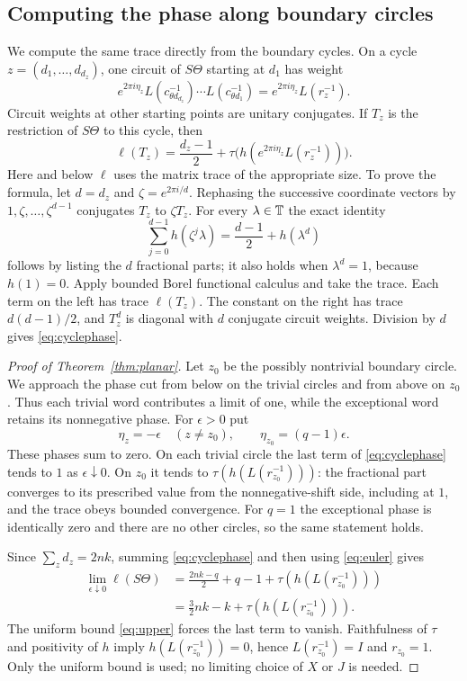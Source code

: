 \subsection{Computing the phase along boundary circles}

We compute the same trace directly from the boundary cycles. On a cycle
$z=(d_1,\ldots,d_{d_z})$, one circuit of $S\Theta$ starting at $d_1$ has
weight
\[
 e^{2\pi i\eta_z}
 L(c_{\theta d_{d_z}}^{-1})\cdots L(c_{\theta d_1}^{-1})
 =e^{2\pi i\eta_z}L(r_z^{-1}).
\]
Circuit weights at other starting points are unitary conjugates.
If $T_z$ is the restriction of $S\Theta$ to this cycle, then
\begin{equation}\label{eq:cyclephase}
 \ell(T_z)=\frac{d_z-1}{2}
   +\tau\bigl(h(e^{2\pi i\eta_z}L(r_z^{-1}))\bigr).
\end{equation}
Here and below $\ell$ uses the matrix trace of the appropriate size.
To prove the formula, let $d=d_z$ and $\zeta=e^{2\pi i/d}$.
Rephasing the successive coordinate vectors by $1,\zeta,\ldots,\zeta^{d-1}$
conjugates $T_z$ to $\zeta T_z$. For every $\lambda\in\mathbb T$ the exact identity
\[
 \sum_{j=0}^{d-1}h(\zeta^j\lambda)
   =\frac{d-1}{2}+h(\lambda^d)
\]
follows by listing the $d$ fractional parts; it also holds when
$\lambda^d=1$, because $h(1)=0$. Apply bounded Borel functional calculus
and take the trace. Each term on the left has trace $\ell(T_z)$.
The constant on the right has trace $d(d-1)/2$, and $T_z^d$ is diagonal
with $d$ conjugate circuit weights. Division by $d$ gives
\eqref{eq:cyclephase}.

\begin{proof}[Proof of Theorem~\ref{thm:planar}]
Let $z_0$ be the possibly nontrivial boundary circle.
We approach the phase cut from below on the trivial circles and from
above on $z_0$. Thus each trivial word contributes a limit of one, while
the exceptional word retains its nonnegative phase. For $\epsilon>0$ put
\[
 \eta_z=-\epsilon\quad(z\ne z_0),\qquad
 \eta_{z_0}=(q-1)\epsilon.
\]
These phases sum to zero. On each trivial circle the last term of
\eqref{eq:cyclephase} tends to $1$ as $\epsilon\downarrow0$.
On $z_0$ it tends to $\tau(h(L(r_{z_0}^{-1})))$: the fractional part
converges to its prescribed value from the nonnegative-shift side,
including at $1$, and the trace obeys bounded convergence.
For $q=1$ the exceptional phase is identically zero and there are no other
circles, so the same statement holds.

Since $\sum_zd_z=2nk$, summing \eqref{eq:cyclephase} and then using
\eqref{eq:euler} gives
\begin{align*}
 \lim_{\epsilon\downarrow0}\ell(S\Theta)
 &=\frac{2nk-q}{2}+q-1+\tau(h(L(r_{z_0}^{-1})))\\
 &=\frac32 nk-k+\tau(h(L(r_{z_0}^{-1}))).
\end{align*}
The uniform bound \eqref{eq:upper} forces the last term to vanish.
Faithfulness of $\tau$ and positivity of $h$ imply
$h(L(r_{z_0}^{-1}))=0$, hence $L(r_{z_0}^{-1})=I$ and $r_{z_0}=1$.
Only the uniform bound is used; no limiting choice of $X$ or $J$ is needed.
\end{proof}
